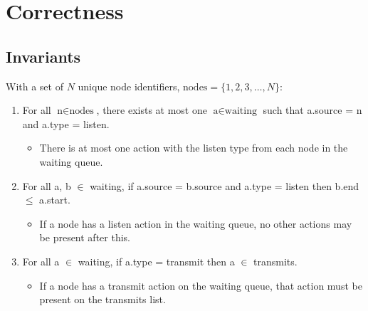 \section{Correctness}

\subsection{Invariants}\label{sec:coordinator-invariants}

With a set of $N$ unique node identifiers, $\text{nodes} = \{ 1, 2, 3, \ldots, N \}$:

\begin{enumerate}
    \item For all $\text{n} \in \text{nodes}$, there exists at most one $\text{a} \in \text{waiting}$ such that a.source = n and a.type = listen.

          \begin{itemize}
              \item There is at most one action with the listen type from each node in the waiting queue.
          \end{itemize}
    \item For all a, b $\in$ waiting, if a.source = b.source and a.type = listen then b.end $\leq$ a.start.
          \begin{itemize}
              \item If a node has a listen action in the waiting queue, no other actions may be present after this.
          \end{itemize}
    \item For all a $\in$ waiting, if a.type = transmit then a $\in$ transmits.

          \begin{itemize}
              \item If a node has a transmit action on the waiting queue, that action must be present on the transmits list.
          \end{itemize}

\end{enumerate}

